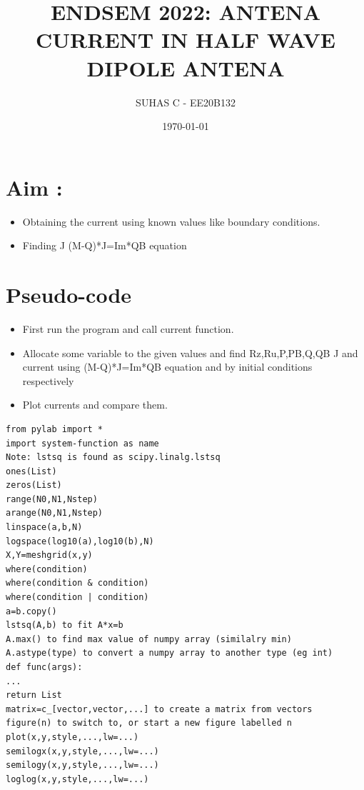 \documentclass[11pt,a4paper]{article}
\title{\textbf{ENDSEM 2022: ANTENA CURRENT IN HALF WAVE DIPOLE ANTENA}} %
\author{SUHAS C - EE20B132} %
\date{\today}%
\begin{document}
\maketitle

\section{Aim :}
\begin{itemize}

\item Obtaining the current using known values like boundary conditions.
\item Finding J  (M-Q)*J=Im*QB equation
\end{itemize}

\newline
\section{Pseudo-code}
\begin{itemize}
\item First run the program and call current function. 
\item Allocate some variable to the given values and find Rz,Ru,P,PB,Q,QB
\itemFind J and current using  (M-Q)*J=Im*QB equation and by initial conditions respectively 
\item Plot currents and compare them.
\end{itemize}

\lstset{language=Python}
\lstset{frame=lines}
\lstset{basicstyle=\footnotesize}
\begin{lstlisting}
from pylab import *
import system-function as name
Note: lstsq is found as scipy.linalg.lstsq
ones(List)
zeros(List)
range(N0,N1,Nstep)
arange(N0,N1,Nstep)
linspace(a,b,N)
logspace(log10(a),log10(b),N)
X,Y=meshgrid(x,y)
where(condition)
where(condition & condition)
where(condition | condition)
a=b.copy()
lstsq(A,b) to fit A*x=b
A.max() to find max value of numpy array (similalry min)
A.astype(type) to convert a numpy array to another type (eg int)
def func(args):
...
return List
matrix=c_[vector,vector,...] to create a matrix from vectors
figure(n) to switch to, or start a new figure labelled n
plot(x,y,style,...,lw=...)
semilogx(x,y,style,...,lw=...)
semilogy(x,y,style,...,lw=...)
loglog(x,y,style,...,lw=...)

\end{lstlisting}
\newline
\end{document}
